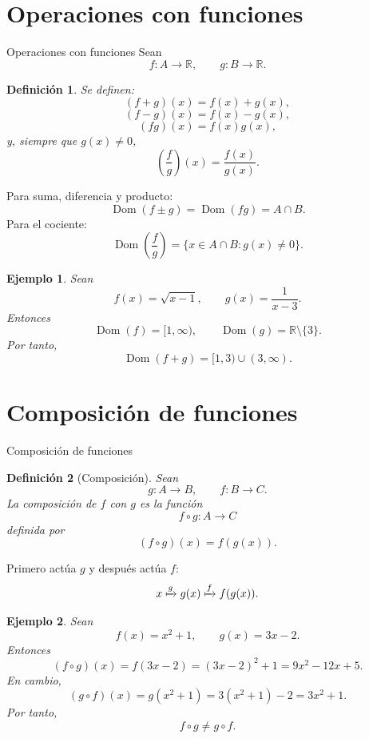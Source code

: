 \documentclass[aspectratio=169,10pt]{beamer}
\newtheorem{definicion}{Definición}
\newtheorem{ejemplo}{Ejemplo}
\newcommand{\R}{\mathbb{R}}
\newcommand{\Dom}{\operatorname{Dom}}
\begin{document}
\section{Operaciones con funciones}
\begin{frame}{Operaciones con funciones}
Sean
\[
f:A\to\R,\qquad g:B\to\R.
\]

\begin{definicion}
Se definen:
\[
(f+g)(x)=f(x)+g(x),
\]
\[
(f-g)(x)=f(x)-g(x),
\]
\[
(fg)(x)=f(x)g(x),
\]
y, siempre que $g(x)\neq0$,
\[
\left(\frac{f}{g}\right)(x)=\frac{f(x)}{g(x)}.
\]
\end{definicion}

Para suma, diferencia y producto:
\[
\Dom(f\pm g)=\Dom(fg)=A\cap B.
\]
Para el cociente:
\[
\Dom\left(\frac fg\right)
=\{x\in A\cap B:g(x)\neq0\}.
\]

\begin{ejemplo}
Sean
\[
f(x)=\sqrt{x-1},
\qquad
g(x)=\frac{1}{x-3}.
\]
Entonces
\[
\Dom(f)=[1,\infty),
\qquad
\Dom(g)=\R\setminus\{3\}.
\]
Por tanto,
\[
\Dom(f+g)=[1,3)\cup(3,\infty).
\]
\end{ejemplo}

\end{frame}
\section{Composición de funciones}
\begin{frame}{Composición de funciones}
\begin{definicion}[Composición]
Sean
\[
g:A\to B,\qquad f:B\to C.
\]
La composición de $f$ con $g$ es la función
\[
f\circ g:A\to C
\]
definida por
\[
(f\circ g)(x)=f(g(x)).
\]
\end{definicion}

Primero actúa $g$ y después actúa $f$:
\[
x\xmapsto{g}g(x)\xmapsto{f}f(g(x)).
\]

\begin{ejemplo}
Sean
\[
f(x)=x^2+1,\qquad g(x)=3x-2.
\]
Entonces
\[
(f\circ g)(x)
=f(3x-2)
=(3x-2)^2+1
=9x^2-12x+5.
\]
En cambio,
\[
(g\circ f)(x)
=g(x^2+1)
=3(x^2+1)-2
=3x^2+1.
\]
Por tanto,
\[
f\circ g\neq g\circ f.
\]
\end{ejemplo}
\end{frame}
\end{document}

